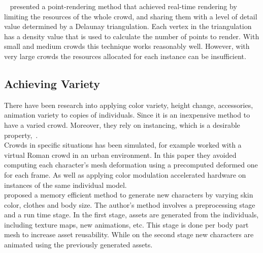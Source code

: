 \documentclass[6pt]{article} %
\begin{document}
\begin{multicols}{2}
~\cite{Larkin2010} presented a point-rendering method that achieved real-time rendering by limiting the resources of the whole crowd, and sharing them with a level of detail value determined by a Delaunay triangulation. 
Each vertex in the triangulation has a density value that is used to calculate the number of points to render.
With small and medium crowds this technique works reasonably well.
However, with very large crowds the resources allocated for each instance can be insufficient.

\subsection{Achieving Variety}

There have been research into applying color variety, height change, accessories, animation variety to copies of individuals.
Since it is an inexpensive method to have a varied crowd.
Moreover, they rely on instancing, which is a desirable property,~\cite{zelsnack2004glsl}.\\

Crowds in specific situations has been simulated, for example \cite{deHeras2005} worked with a virtual Roman crowd in an urban environment.
In this paper they avoided computing each character’s mesh deformation using a precomputed deformed one for each frame. As well as applying color modulation accelerated hardware on instances of the same individual model.\\

\cite{ruiz2013} proposed a memory efficient method to generate new characters by varying skin color, clothes and body size.
The author's method involves a preprocessing stage and a run time stage.
In the first stage, assets are generated from the individuals, including texture maps, new animations, etc.
This stage is done per body part mesh to increase asset reusability.
While on the second stage new characters are animated using the previously generated assets.



\end{multicols}
\end{document}
